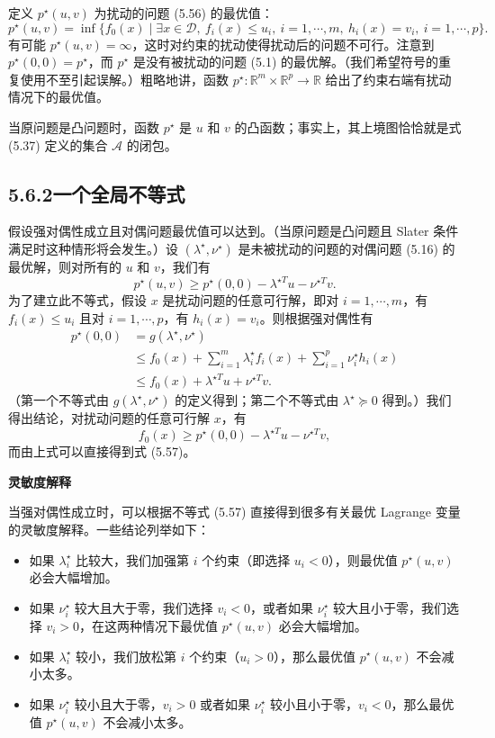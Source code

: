 \documentclass[UTF8, 12pt, fontset=fandol, oneside]{ctexart}
\begin{document}
定义 $p^\star(u,v)$ 为扰动的问题 (5.56) 的最优值：
\[
p^\star(u,v)=\inf\{f_0(x)\mid \exists x\in\mathcal{D},\ f_i(x)\leq u_i,\ i=1,\cdots,m,\ h_i(x)=v_i,\ i=1,\cdots,p\}.
\]
有可能 $p^\star(u,v)=\infty$，这时对约束的扰动使得扰动后的问题不可行。注意到 $p^\star(0,0)=p^\star$，而 $p^\star$ 是没有被扰动的问题 (5.1) 的最优解。（我们希望符号的重复使用不至引起误解。）粗略地讲，函数 $p^\star:\mathbb{R}^m\times\mathbb{R}^p\to\mathbb{R}$ 给出了约束右端有扰动情况下的最优值。

当原问题是凸问题时，函数 $p^\star$ 是 $u$ 和 $v$ 的凸函数；事实上，其上境图恰恰就是式 (5.37) 定义的集合 $\mathcal{A}$ 的闭包。

\subsection*{5.6.2\quad 一个全局不等式}

假设强对偶性成立且对偶问题最优值可以达到。（当原问题是凸问题且 Slater 条件满足时这种情形将会发生。）设 $(\lambda^\star,\nu^\star)$ 是未被扰动的问题的对偶问题 (5.16) 的最优解，则对所有的 $u$ 和 $v$，我们有
\begin{equation}
p^\star(u,v)\geq p^\star(0,0)-\lambda^{\star T}u-\nu^{\star T}v.
\tag{5.57}
\end{equation}
为了建立此不等式，假设 $x$ 是扰动问题的任意可行解，即对 $i=1,\cdots,m$，有 $f_i(x)\leq u_i$ 且对 $i=1,\cdots,p$，有 $h_i(x)=v_i$。则根据强对偶性有
\[
\begin{aligned}
p^\star(0,0)
&=g(\lambda^\star,\nu^\star)\\
&\leq f_0(x)+\sum_{i=1}^m\lambda_i^\star f_i(x)+\sum_{i=1}^p\nu_i^\star h_i(x)\\
&\leq f_0(x)+\lambda^{\star T}u+\nu^{\star T}v.
\end{aligned}
\]
（第一个不等式由 $g(\lambda^\star,\nu^\star)$ 的定义得到；第二个不等式由 $\lambda^\star\succeq 0$ 得到。）我们得出结论，对扰动问题的任意可行解 $x$，有
\[
f_0(x)\geq p^\star(0,0)-\lambda^{\star T}u-\nu^{\star T}v,
\]
而由上式可以直接得到式 (5.57)。

\noindent\textbf{灵敏度解释}

当强对偶性成立时，可以根据不等式 (5.57) 直接得到很多有关最优 Lagrange 变量的灵敏度解释。一些结论列举如下：
\begin{itemize}
\item 如果 $\lambda_i^\star$ 比较大，我们加强第 $i$ 个约束（即选择 $u_i<0$），则最优值 $p^\star(u,v)$ 必会大幅增加。
\item 如果 $\nu_i^\star$ 较大且大于零，我们选择 $v_i<0$，或者如果 $\nu_i^\star$ 较大且小于零，我们选择 $v_i>0$，在这两种情况下最优值 $p^\star(u,v)$ 必会大幅增加。
\item 如果 $\lambda_i^\star$ 较小，我们放松第 $i$ 个约束（$u_i>0$），那么最优值 $p^\star(u,v)$ 不会减小太多。
\item 如果 $\nu_i^\star$ 较小且大于零，$v_i>0$ 或者如果 $\nu_i^\star$ 较小且小于零，$v_i<0$，那么最优值 $p^\star(u,v)$ 不会减小太多。
\end{itemize}
\end{document}
